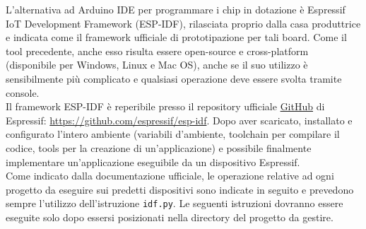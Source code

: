 \noindent L'alternativa ad Arduino IDE per programmare i chip in dotazione è Espressif IoT Development Framework (ESP-IDF), rilasciata proprio dalla casa produttrice e indicata come il framework ufficiale di prototipazione per tali board.
Come il tool precedente, anche esso risulta essere open-source e cross-platform (disponibile per Windows, Linux e Mac OS), anche se il suo utilizzo è sensibilmente più complicato e qualsiasi operazione deve essere svolta tramite console.\\
Il framework ESP-IDF è reperibile presso il repository ufficiale \href{https://github.com/espressif/esp-idf}{GitHub} di Espressif: \url{https://github.com/espressif/esp-idf}. Dopo aver scaricato, installato e configurato l'intero ambiente (variabili d'ambiente, toolchain per compilare il codice, tools per la creazione di un'applicazione) e possibile finalmente implementare un'applicazione eseguibile da un dispositivo Espressif.\\
Come indicato dalla documentazione ufficiale, le operazione relative ad ogni progetto da eseguire sui predetti dispositivi sono indicate in seguito e prevedono sempre l'utilizzo dell'istruzione \texttt{idf.py}. Le seguenti istruzioni dovranno essere eseguite solo dopo essersi posizionati nella directory del progetto da gestire.
\renewcommand{\theenumi}{\roman{enumi}}
